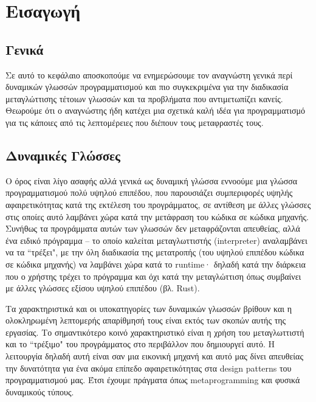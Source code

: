 
\chapter{Εισαγωγή}
\label{chapter1} %

\section{Γενικά}

Σε αυτό το κεφάλαιο αποσκοπούμε να ενημερώσουμε τον αναγνώστη γενικά περί
δυναμικών γλωσσών προγραμματισμού και πιο συγκεκριμένα για την διαδικασία
μεταγλώττισης τέτοιων γλωσσών και τα προβλήματα που αντιμετωπίζει κανείς.
Θεωρούμε ότι ο αναγνώστης ήδη κατέχει μια σχετικά καλή ιδέα για προγραμματισμό
για τις κάποιες από τις λεπτομέρειες που διέπουν τους μεταφραστές τους.


\section{Δυναμικές Γλώσσες}

Ο όρος είναι λίγο ασαφής αλλά γενικά ως δυναμική γλώσσα εννοούμε μια γλώσσα
προγραμματισμού πολύ υψηλού επιπέδου, που παρουσιάζει συμπεριφορές υψηλής
αφαιρετικότητας κατά της εκτέλεση του προγράμματος, σε αντίθεση με άλλες γλώσσες
στις οποίες αυτό λαμβάνει χώρα κατά την μετάφραση του κώδικα σε κώδικα μηχανής.
Συνήθως τα προγράμματα αυτών των γλωσσών δεν μεταφράζονται απευθείας, αλλά ένα
ειδικό πρόγραμμα – το οποίο καλείται μεταγλωττιστής (interpreter) αναλαμβάνει να
τα ``τρέξει", με την όλη διαδικασία της μετατροπής (του υψηλού επιπέδου κώδικα σε
κώδικα μηχανής) να λαμβάνει χώρα κατά το runtime· δηλαδή κατά την διάρκεια που ο
χρήστης τρέχει το πρόγραμμα και όχι κατά την μεταγλώττιση όπως συμβαίνει με
άλλες γλώσσες εξίσου υψηλού επιπέδου (βλ. Rust).

Τα χαρακτηριστικά και οι υποκατηγορίες των δυναμικών γλωσσών βρίθουν και η
ολοκληρωμένη λεπτομερής απαρίθμησή τους είναι εκτός των σκοπών αυτής της
εργασίας. Το σημαντικότερο κοινό χαρακτηριστικό είναι η χρήση του μεταγλωττιστή
και το ``τρέξιμο" του προγράμματος στο περιβάλλον που δημιουργεί αυτό. Η
λειτουργία δηλαδή αυτή είναι σαν μια εικονική μηχανή και αυτό μας δίνει
απευθείας την δυνατότητα για ένα ακόμα επίπεδο αφαιρετικότητας στα design
patterns του προγραμματισμού μας. Έτσι έχουμε πράγματα όπως metaprogramming και
φυσικά δυναμικούς τύπους.

